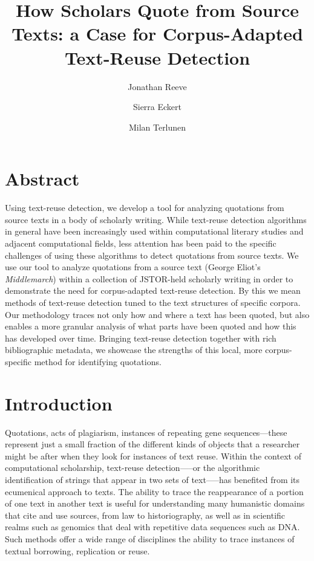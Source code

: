 \documentclass[
]{article}
\title{How Scholars Quote from Source Texts: a Case for Corpus-Adapted
Text-Reuse Detection}
\author{Jonathan Reeve \and Sierra Eckert \and Milan Terlunen}
\date{}
\begin{document}
\maketitle

\doublespacing

\hypertarget{abstract}{%
\section{Abstract}\label{abstract}}

Using text-reuse detection, we develop a tool for analyzing quotations
from source texts in a body of scholarly writing. While text-reuse
detection algorithms in general have been increasingly used within
computational literary studies and adjacent computational fields, less
attention has been paid to the specific challenges of using these
algorithms to detect quotations from source texts. We use our tool to
analyze quotations from a source text (George Eliot's
\emph{Middlemarch}) within a collection of JSTOR-held scholarly writing
in order to demonstrate the need for corpus-adapted text-reuse
detection. By this we mean methods of text-reuse detection tuned to the
text structures of specific corpora. Our methodology traces not only how
and where a text has been quoted, but also enables a more granular
analysis of what parts have been quoted and how this has developed over
time. Bringing text-reuse detection together with rich bibliographic
metadata, we showcase the strengths of this local, more corpus-specific
method for identifying quotations.

\hypertarget{introduction}{%
\section{Introduction}\label{introduction}}

Quotations, acts of plagiarism, instances of repeating gene
sequences---these represent just a small fraction of the different kinds
of objects that a researcher might be after when they look for instances
of text reuse. Within the context of computational scholarship,
text-reuse detection-----or the algorithmic identification of strings
that appear in two sets of text-----has benefited from its ecumenical
approach to texts. The ability to trace the reappearance of a portion of
one text in another text is useful for understanding many humanistic
domains that cite and use sources, from law to historiography, as well
as in scientific realms such as genomics that deal with repetitive data
sequences such as DNA. Such methods offer a wide range of disciplines
the ability to trace instances of textual borrowing, replication or
reuse.
\end{document}
